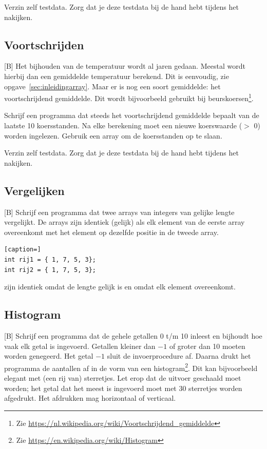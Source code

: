 \documentclass[a4paper,10pt,fleqn,twoside]{article}
\begin{document}
Verzin zelf testdata. Zorg dat je deze testdata bij de hand hebt tijdens het nakijken.

\subsection{Voortschrijden}[B]
Het bijhouden van de temperatuur wordt al jaren gedaan. Meestal wordt hierbij dan een gemiddelde temperatuur berekend. Dit is eenvoudig, zie opgave~\ref{sec:inleidingarray}. Maar er is nog een soort gemiddelde: het voortschrijdend gemiddelde. Dit wordt bijvoorbeeld gebruikt bij beurskoersen\footnote{Zie \url{https://nl.wikipedia.org/wiki/Voortschrijdend_gemiddelde}}.

Schrijf een programma dat steeds het voortschrijdend gemiddelde bepaalt van de laatste 10 koersstanden. Na elke berekening moet een nieuwe koerswaarde ($>$ 0) worden ingelezen. Gebruik een array om de koersstanden op te slaan.

Verzin zelf testdata. Zorg dat je deze testdata bij de hand hebt tijdens het nakijken.

\subsection{Vergelijken}[B]
Schrijf een programma dat twee arrays van integers van gelijke lengte vergelijkt. De arrays zijn identiek (gelijk) als elk element van de eerste array overeenkomt met het element op dezelfde positie in de tweede array.

\begin{lstlisting}[caption=]
int rij1 = { 1, 7, 5, 3};
int rij2 = { 1, 7, 5, 3};
\end{lstlisting}

zijn identiek omdat de lengte gelijk is en omdat elk element overeenkomt.

\subsection{Histogram}[B]
Schrijf een programma dat de gehele getallen 0 t/m 10 inleest en bijhoudt hoe vaak elk getal is ingevoerd. Getallen kleiner dan $-1$ of groter dan 10 moeten worden genegeerd. Het getal $-1$ sluit de invoerprocedure af. Daarna drukt het programma de aantallen af in de vorm van een histogram\footnote{Zie \url{https://en.wikipedia.org/wiki/Histogram}}. Dit kan bijvoorbeeld elegant met (een rij van) sterretjes. Let erop dat de uitvoer geschaald moet worden; het getal dat het meest is ingevoerd moet met 30 sterretjes worden afgedrukt. Het afdrukken mag horizontaal of verticaal.
\end{document}
